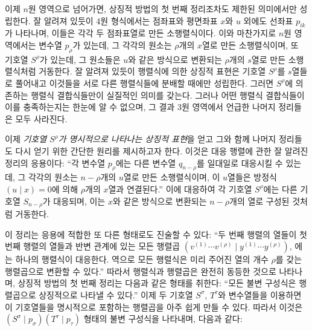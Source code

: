 이제 $n$원 영역으로 넘어가면, 상징적 방법의 첫 번째 정리조차도 제한된 의미에서만 성립한다. 잘 알려져 있듯이 4원 형식에서는 점좌표와 평면좌표 $x$와 $u$ 외에도 선좌표 $p_{ik}$가 나타나며, 이들은 각각 두 점좌표열로 만든 소행렬식이다. 이와 마찬가지로 $n$원 영역에서는 변수열 $p_\rho$가 있는데, 그 각각의 원소는 $\rho$개의 $x$열로 만든 소행렬식이며, 또 기호열 $S^\rho$가 있는데, 그 원소들은 $u$와 같은 방식으로 변환되는 $\rho$개의 $s$열로 만든 소행렬식처럼 거동한다. 잘 알려져 있듯이 행렬식에 의한 상징적 표현은 기호열 $S^\rho$를 $s$열들로 풀어내고 이것들을 서로 다른 행렬식들에 분배할 때에만 성립한다. 그러면 $S^\rho$에 의존하는 행렬식 결합식들만이 실질적인 의미를 갖는다. 그러나 어떤 행렬식 결합식들이 이를 충족하는지는 한눈에 알 수 없으며, 그 결과 3원 영역에서 언급한 나머지 정리들은 모두 사라진다.

이제 \emph{기호열 $S^\rho$가 명시적으로 나타나는 상징적 표현}을 얻고 그와 함께 나머지 정리들도 다시 얻기 위한 간단한 원리를 제시하고자 한다. 이것은 대응 행렬에 관한 잘 알려진 정리의 응용이다: ``각 변수열 $p_\rho$에는 다른 변수열 $q_{n-\rho}$를 일대일로 대응시킬 수 있는데, 그 각각의 원소는 $n-\rho$개의 $u$열로 만든 소행렬식이며, 이 $u$열들은 방정식 $(u\mid x)=0$에 의해 $\rho$개의 $x$열과 연결된다.'' 이에 대응하여 각 기호열 $S^\rho$에는 다른 기호열 $S_{n-\rho}$가 대응되며, 이는 $x$와 같은 방식으로 변환되는 $n-\rho$개의 열로 구성된 것처럼 거동한다.

이 정리는 응용에 적합한 또 다른 형태로도 진술할 수 있다: ``두 번째 행렬의 열들이 첫 번째 행렬의 열들과 반변 관계에 있는 모든 행렬곱 $(v^{(1)}\cdots v^{(\rho)}\mid y^{(1)}\cdots y^{(\rho)})$, 에는 하나의 행렬식이 대응한다. 역으로 모든 행렬식은 미리 주어진 열의 개수 $\rho$를 갖는 행렬곱으로 변환할 수 있다.'' 따라서 행렬식과 행렬곱은 완전히 동등한 것으로 나타나며, 상징적 방법의 첫 번째 정리는 다음과 같은 형태를 취한다: ``모든 불변 구성식은 행렬곱으로 상징적으로 나타낼 수 있다.'' 이제 두 기호열 $S^\sigma$, $T^\tau$와 변수열들을 이용하면 이 기호열들을 명시적으로 포함하는 행렬곱을 아주 쉽게 만들 수 있다. 따라서 이것은 $(S^\sigma\mid p_\sigma)(T^\tau\mid p_\tau)$ 형태의 불변 구성식을 나타내며, 다음과 같다:

